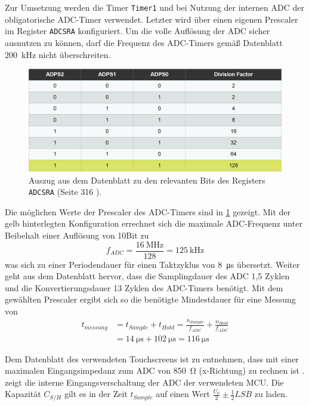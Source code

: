 		Zur Umsetzung werden die Timer \texttt{Timer1} und bei Nutzung der internen ADC der obligatorische ADC-Timer verwendet.
		Letzter wird über einen eigenen Prescaler im Register \texttt{ADCSRA} konfiguriert.
		Um die volle Auflösung der ADC sicher ausnutzen zu können, darf die Frequenz des ADC-Timers gemäß Datenblatt \SI{200}{\kilo\hertz} nicht überschreiten.
		\begin{figure}[h]
			\centering
			\includegraphics[width=.9\textwidth]{fig/ADC-Timer_Config.png}
			\caption[Auszug aus dem Datenblatt zu den relevanten Bits des Registers \texttt{ADCSRA}]{Auszug aus dem Datenblatt zu den relevanten Bits des Registers \texttt{ADCSRA} (Seite 316 \cite{MicrochipTechnologyInc.ATmega32U4.Datasheet.2016}).}
			\label{fig:adc timer konfig}
		\end{figure}
		Die möglichen Werte der Prescaler des ADC-Timers sind in \cref{fig:adc timer konfig} gezeigt.
		Mit der gelb hinterlegten Konfiguration errechnet sich die maximale ADC-Frequenz unter Beibehalt einer Auflösung von 10Bit zu
		\begin{equation}
			f_{ADC} = \frac{\SI{16}{\mega\hertz}}{128} = \SI{125}{\kilo\hertz}
			\label{eq:adc timer}
		\end{equation}
		was sich zu einer Periodendauer für einen Taktzyklus von \SI{8}{\micro\second} übersetzt.
		Weiter geht aus dem Datenblatt hervor, dass die Samplingdauer des ADC 1,5 Zyklen und die Konvertierungsdauer 13 Zyklen des ADC-Timers benötigt.
		Mit dem gewählten Prescaler ergibt sich so die benötigte Mindestdauer für eine Messung von
		\begin{align}
			t_{messung} &= t_{Sample} + t_{Hold} = \frac{n_{Sample}}{f_{ADC}} + \frac{n_{Hold}}{f_{ADC}} \nonumber \\
						&= \SI{14}{\micro\second} + \SI{102}{\micro\second} = \SI{116}{\micro\second}
			\label{eq:adc messdauer}
		\end{align}

		Dem Datenblatt des verwendeten Touchscreens ist zu entnehmen, dass mit einer maximalen Eingangsimpedanz zum ADC von \SI{850}{\ohm} (x-Richtung) zu rechnen ist \cite{FUJITSU.touchscreen.datasheet}.
		 zeigt die interne Eingangsverschaltung der ADC der verwendeten MCU. Die Kapazität \(C_{S/H}\) gilt es in der Zeit \(t_{Sample}\) auf einen Wert \(\frac{U_0}{2} \pm \frac{1}{2}LSB\) zu laden.

